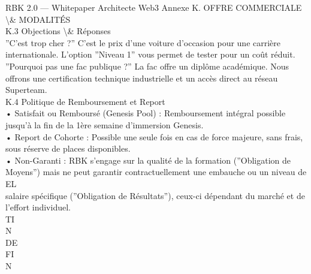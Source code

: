 RBK 2.0 — Whitepaper Architecte Web3                                                                           Annexe K. OFFRE COMMERCIALE \textbackslash{}& MODALITÉS\\
\vspace{0.5em}
\vspace{0.5em}
\vspace{0.5em}
K.3 Objections \textbackslash{}& Réponses\\
”C’est trop cher ?” C’est le prix d’une voiture d’occasion pour une carrière internationale. L’option ”Niveau 1” vous permet de tester pour un coût réduit.\\
”Pourquoi pas une fac publique ?” La fac offre un diplôme académique. Nous offrons une certification technique industrielle et un accès direct au réseau\\
Superteam.\\
\vspace{0.5em}
\vspace{0.5em}
\vspace{0.5em}
K.4 Politique de Remboursement et Report\\
• Satisfait ou Remboursé (Genesis Pool) : Remboursement intégral possible jusqu’à la fin de la 1ère semaine d’immersion Genesis.\\
\vspace{0.5em}
• Report de Cohorte : Possible une seule fois en cas de force majeure, sans frais, sous réserve de places disponibles.\\
\vspace{0.5em}
• Non-Garanti : RBK s’engage sur la qualité de la formation (”Obligation de Moyens”) mais ne peut garantir contractuellement une embauche ou un niveau de\\
\vspace{0.5em}
\vspace{0.5em}
\vspace{0.5em}
\vspace{0.5em}
EL\\
salaire spécifique (”Obligation de Résultats”), ceux-ci dépendant du marché et de l’effort individuel.\\
\vspace{0.5em}
\vspace{0.5em}
\vspace{0.5em}
\vspace{0.5em}
TI\\
N\\
DE\\
FI\\
N\\
